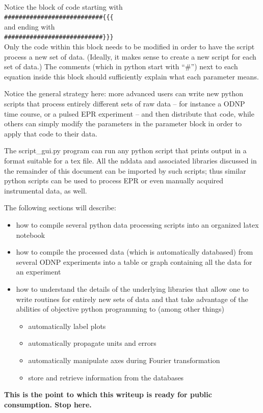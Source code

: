 \quad\\ 
Notice the block of code starting with\\ 
    \verb|###########################{{{|\\ 
    and ending with\\ 
    \verb|###########################}}}|\\ 
Only the code within this block
    needs to be modified in order to have
    the script process a new set of data.
(Ideally, it makes sense to create a new script
    for each set of data.)
The comments (which in python start with ``\#'')
    next to each equation
    inside this block
    should sufficiently explain
    what each parameter means.

Notice the general strategy here:
    more advanced users can write new python scripts
    that process entirely different sets of raw data
    -- for instance a ODNP time course, or a pulsed EPR experiment --
    and then distribute that code,
    while others can simply modify the parameters in the
    parameter block  in order to apply that code to
    their data.

The script\_gui.py program can run any python script
    that prints output in a format suitable for a tex file.
All the nddata and associated libraries discussed in the
    remainder of this document can be imported by such scripts;
thus similar python scripts
    can be used to process EPR or even manually acquired
    instrumental data, as well.

The following sections will describe:
\begin{itemize}
    \item how to compile several python data processing
        scripts into an organized latex notebook
    \item how to compile the processed data (which is
        automatically databased) from several ODNP
        experiments into a table or graph containing all
        the data for an experiment
    \item how to understand the details of the underlying
        libraries
        that allow one to write routines for entirely
        new sets of data
        and that take advantage of the
        abilities of objective python programming to
        (among other things)
        \begin{itemize}
            \item automatically label plots
            \item automatically propagate units and
                errors
            \item automatically manipulate axes during Fourier
                transformation
            \item store and retrieve information from the databases
        \end{itemize}
\end{itemize}
\textbf{This is the point to which this writeup is ready
for public consumption.  Stop here.}
